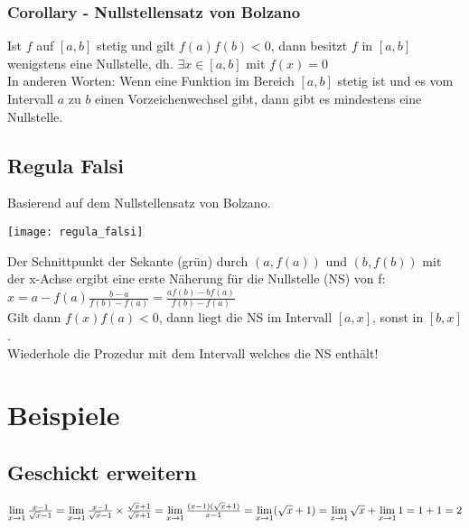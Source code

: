 \documentclass[../main.tex]{subfiles}
\begin{document}
\subsubsection{Corollary - Nullstellensatz von Bolzano}
Ist $f$ auf $[a,b]$ stetig und gilt $f(a)f(b) < 0$, dann besitzt $f$ in $[a,b]$ wenigstens eine Nullstelle, dh. $\exists x \in [a,b]$ mit $f(x)=0$ \\
In anderen Worten: Wenn eine Funktion im Bereich $[a,b]$ stetig ist und es vom Intervall $a$ zu $b$ einen Vorzeichenwechsel gibt, dann gibt es mindestens eine Nullstelle.

\subsection{Regula Falsi}
Basierend auf dem Nullstellensatz von Bolzano.

\begin{minipage}{0.5\textwidth}
        \texttt{[image: regula\_falsi]}
\end{minipage} \hfill
\begin{minipage}{0.45\textwidth}
    Der Schnittpunkt der Sekante (grün) durch $(a, f(a))$ und $(b, f(b))$ mit der x-Achse ergibt eine erste Näherung für die Nullstelle (NS) von f: \\ [7pt]
    $x = a-f(a) \frac{b-a}{f(b)-f(a)} = \frac{af(b)-bf(a)}{f(b)-f(a)}$  \\ [7pt]
    Gilt dann $f(x)f(a)<0$, dann liegt die NS im Intervall $[a,x]$, sonst in $[b,x]$. \\
    Wiederhole die Prozedur mit dem Intervall welches die NS enthält!
\end{minipage}


\section{Beispiele}
\subsection{Geschickt erweitern}
\begin{math}
    \lim\limits_{x\to 1} \frac{x-1}{\sqrt{x}-1} =
    \lim\limits_{x\to 1} \frac{x-1}{\sqrt{x}-1} \times \frac{\sqrt{x}+1}{\sqrt{x}+1} =
    \lim\limits_{x\to 1} \frac{(x-1)(\sqrt{x}+1)}{x-1} = \\ [7pt]
    \lim\limits_{x\to 1} (\sqrt{x}+1) =
    \lim\limits_{x\to 1} \sqrt{x} + \lim\limits_{x\to 1} 1 =
    1 + 1 = 2
\end{math}
\end{document}
